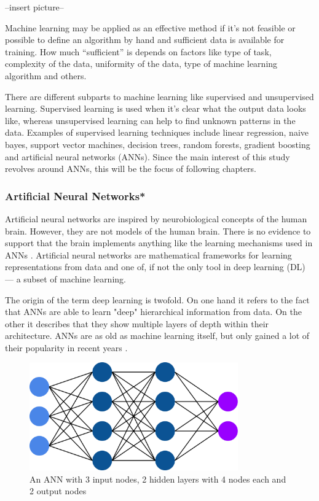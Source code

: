 --insert picture--

Machine learning may be applied as an effective method if it's not feasible or possible to define an algorithm by hand and sufficient data is available for training. How much “sufficient” is depends on factors like type of task, complexity of the data, uniformity of the data, type of machine learning algorithm and others.

There are different subparts to machine learning like supervised and unsupervised learning. Supervised learning is used when it's clear what the output data looks like, whereas unsupervised learning can help to find unknown patterns in the data. Examples of supervised learning techniques include linear regression, naive bayes, support vector machines, decision trees, random forests, gradient boosting and artificial neural networks (ANNs). Since the main interest of this study revolves around ANNs, this will be the focus of following chapters.

\subsubsection{Artificial Neural Networks*}

Artificial neural networks are inspired by neurobiological concepts of the human brain. However, they are not models of the human brain. There is no evidence to support that the brain implements anything like the learning mechanisms used in ANNs \cite{Chollet2017}. Artificial neural networks are mathematical frameworks for learning representations from data and one of, if not the only tool in deep learning (DL) --- a subset of machine learning.

The origin of the term deep learning is twofold. On one hand it refers to the fact that ANNs are able to learn "deep" hierarchical information from data. On the other it describes that they show multiple layers of depth within their architecture. ANNs are as old as machine learning itself, but only gained a lot of their popularity in recent years \cite{Chollet2017}.

\begin{figure}[H]
\centering
\par
\includegraphics[width=0.8\textwidth]{imgs/ann.png}
\caption{An ANN with 3 input nodes, 2 hidden layers with 4 nodes each and 2 output nodes}
\par
\end{figure}

